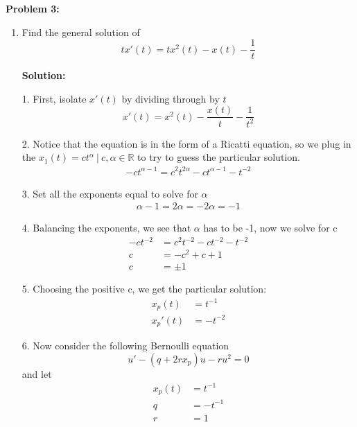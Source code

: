 \documentclass[12pt]{article}
\begin{document}
\newpage

\noindent \textbf{Problem 3:}
\begin{enumerate}
    \item[(a)] Find the general solution of
          \[ tx'(t) = tx^2(t) - x(t) - \frac{1}{t} \]

          \textbf{Solution:}

          1. First, isolate $x'(t)$ by dividing through by $t$
          \[
              x'(t) = x^2(t)  - \frac{x(t)}{t} - \frac{1}{t^2}
          \]

          2. Notice that the equation is in the form of a Ricatti equation, so we plug in the $x_1(t) = ct^{\alpha{}} ~|~ c, \alpha{} \in{\mathbb{R}}$ to try to guess the particular solution.
          \begin{align*}
              -ct^{\alpha{}-1} = c^2t^{2\alpha{}}  - ct^{\alpha{}-1} - t^{-2}
          \end{align*}

          3. Set all the exponents equal to solve for $\alpha{}$
          \begin{align*}
              \alpha{} - 1 = 2\alpha{} = -2
              \alpha{} = -1
          \end{align*}

          4. Balancing the exponents, we see that $\alpha{}$ has to be -1, now we solve for c
          \begin{align*}
              -ct^{-2} & = c^2t^{-2}  - ct^{-2} - t^{-2} \\
              c        & = -c^2 + c + 1                  \\
              c        & = \pm{1}
          \end{align*}

          5. Choosing the positive c, we get the particular solution:
          \begin{align*}
              x_p(t)  & = t^{-1}  \\
              x_p'(t) & = -t^{-2}
          \end{align*}

          6. Now consider the following Bernoulli equation
          \[
              u'-(q+2rx_p)u-ru^2=0
          \]
          and let
          \begin{align*}
              x_p(t) & = t^{-1}  \\
              q      & = -t^{-1} \\
              r      & = 1
          \end{align*}


\end{enumerate}
\end{document}

